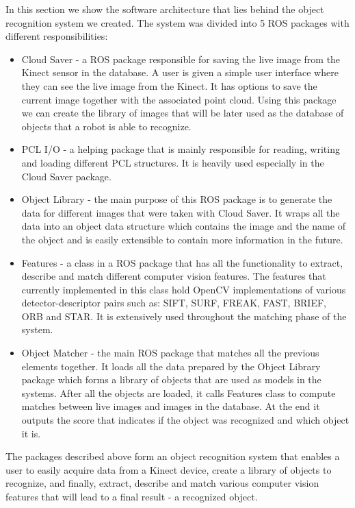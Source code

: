 In this section we show the software architecture that lies behind the object recognition system we created. The system was divided into 5 ROS packages with different responsibilities:
\begin{itemize}
\item Cloud Saver - a ROS package responsible for saving the live image from the Kinect sensor in the database. A user is given a simple user interface where they can see the live image from the Kinect. It has options to save the current image together with the associated point cloud. Using this package we can create the library of images that will be later used as the database of objects that a robot is able to recognize.
\item PCL I/O - a helping package that is mainly responsible for reading, writing and loading different PCL structures. It is heavily used especially in the Cloud Saver package.
\item Object Library - the main purpose of this ROS package is to generate the data for different images that were taken with Cloud Saver. It wraps all the data into an object data structure which contains the image and the name of the object and is easily extensible to contain more information in the future.
\item Features - a class in a ROS package that has all the functionality to extract, describe and match different computer vision features. The features that currently implemented in this class hold OpenCV implementations of various detector-descriptor pairs such as: SIFT, SURF, FREAK, FAST, BRIEF, ORB and STAR. It is extensively used throughout the matching phase of the system.
\item Object Matcher - the main ROS package that matches all the previous elements together. It loads all the data prepared by the Object Library package which forms a library of objects that are used as models in the systems. After all the objects are loaded, it calls Features class to compute matches between live images and images in the database. At the end it outputs the score that indicates if the object was recognized and which object it is.
\end{itemize}


The packages described above form an object recognition system that enables a user to easily acquire data from a Kinect device, create a library of objects to recognize, and finally, extract, describe and match various computer vision features that will lead to a final result - a recognized object.





